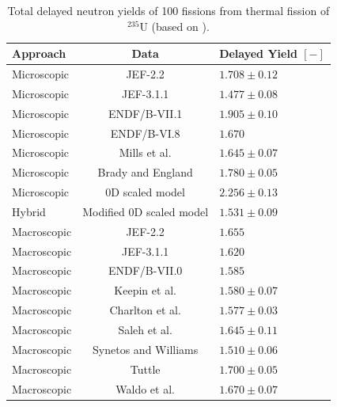 \begin{table}[!h]
    \centering
    \caption{Total delayed neutron yields of 100 fissions from thermal fission of $^{235}$U (based on \cite{huynh2014calculation}).}
    \begin{tabular}{lcl}
        \hline
       Approach & Data & Delayed Yield $[-]$ \\
       \hline
        Microscopic & JEF-2.2 \cite{bank2000jef} & $1.708 \pm 0.12$\\
        Microscopic & JEF-3.1.1 \cite{santamarina2009jeff} & $1.477 \pm 0.08$\\
        Microscopic & ENDF/B-VII.1 \cite{chadwick2011endf} & $1.905 \pm 0.10$\\
        Microscopic & ENDF/B-VI.8 \cite{endf6}   & $1.670$ \\
        Microscopic & Mills et al. \cite{mills1991study}    & $1.645 \pm 0.07$ \\
        Microscopic & Brady and England \cite{brady1989delayed} & $1.780 \pm 0.05$\\
        Microscopic & 0D scaled model & $2.256 \pm 0.13$ \\
        Hybrid & Modified 0D scaled model & $1.531 \pm 0.09$\\
        Macroscopic & JEF-2.2 \cite{bank2000jef} & $1.655$\\
        Macroscopic & JEF-3.1.1 \cite{santamarina2009jeff} & $1.620$\\
        Macroscopic & ENDF/B-VII.0 \cite{chadwick2006endf} & $1.585$\\
        Macroscopic & Keepin et al. \cite{keepin1957delayed} & $1.580 \pm 0.07$ \\
        Macroscopic & Charlton et al. \cite{charlton1996delayed}\tnote{*} & $1.577 \pm 0.03$\\
        Macroscopic & Saleh et al. \cite{saleh1997measurements} & $1.645 \pm 0.11$ \\
        Macroscopic & Synetos and Williams \cite{synetos1983delayed}\tnote{*} & $1.510 \pm 0.06$ \\
        Macroscopic & Tuttle \cite{tuttle1975delayed}    & $1.700 \pm  0.05$\\
        Macroscopic & Waldo et al.\cite{waldo1981delayed}    & $1.670 \pm 0.07$ \\
        \hline
    \end{tabular}
    \label{tab:total-delnu-compare-net}
\end{table}

